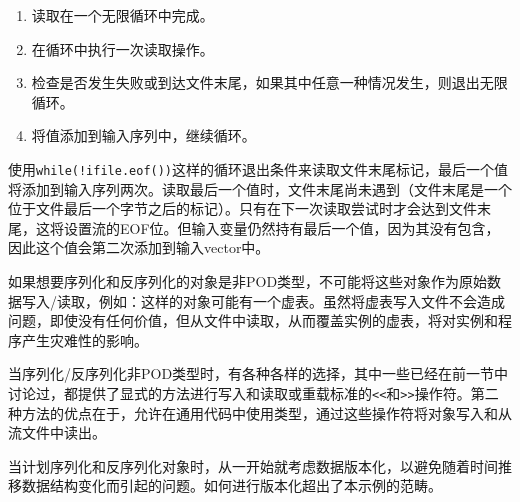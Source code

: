 \begin{enumerate}
\item
读取在一个无限循环中完成。

\item
在循环中执行一次读取操作。

\item
检查是否发生失败或到达文件末尾，如果其中任意一种情况发生，则退出无限循环。

\item
将值添加到输入序列中，继续循环。
\end{enumerate}

使用\verb|while(!ifile.eof())|这样的循环退出条件来读取文件末尾标记，最后一个值将添加到输入序列两次。读取最后一个值时，文件末尾尚未遇到（文件末尾是一个位于文件最后一个字节之后的标记）。只有在下一次读取尝试时才会达到文件末尾，这将设置流的EOF位。但输入变量仍然持有最后一个值，因为其没有包含，因此这个值会第二次添加到输入vector中。

如果想要序列化和反序列化的对象是非POD类型，不可能将这些对象作为原始数据写入/读取，例如：这样的对象可能有一个虚表。虽然将虚表写入文件不会造成问题，即使没有任何价值，但从文件中读取，从而覆盖实例的虚表，将对实例和程序产生灾难性的影响。

当序列化/反序列化非POD类型时，有各种各样的选择，其中一些已经在前一节中讨论过，都提供了显式的方法进行写入和读取或重载标准的\verb|<<|和\verb|>>|操作符。第二种方法的优点在于，允许在通用代码中使用类型，通过这些操作符将对象写入和从流文件中读出。

\begin{myNotic}
当计划序列化和反序列化对象时，从一开始就考虑数据版本化，以避免随着时间推移数据结构变化而引起的问题。如何进行版本化超出了本示例的范畴。
\end{myNotic}

